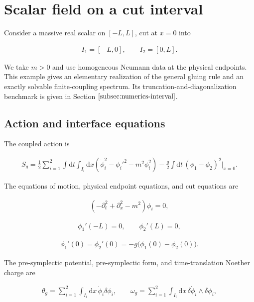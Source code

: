 \section{Scalar field on a cut interval}\label{sec:interval-scalar}

Consider a massive real scalar on $[-L,L]$, cut at $x=0$ into

\begin{align}
I_1=[-L,0],
\qquad
I_2=[0,L].
\end{align}

We take $m>0$ and use homogeneous Neumann data at the physical endpoints. This example gives an elementary realization of the general gluing rule and an exactly solvable finite-coupling spectrum. Its truncation-and-diagonalization benchmark is given in Section $\ref{subsec:numerics-interval}$.

\subsection{Action and interface equations}\label{subsec:interval-action}

The coupled action is

\begin{align}
S_g
=\frac12\sum_{i=1}^2\int\mathrm dt\int_{I_i}\mathrm dx
\left(\dot\phi_i^2-\phi_i'^2-m^2\phi_i^2\right)
-\frac g2\int\mathrm dt\,(\phi_1-\phi_2)^2\big|_{x=0}.
\end{align}

The equations of motion, physical endpoint equations, and cut equations are

\begin{align}
(-\partial_t^2+\partial_x^2-m^2)\phi_i=0,
\end{align}

\begin{align}
\phi_1'(-L)=0,
\qquad
\phi_2'(L)=0,
\end{align}

\begin{align}
\phi_1'(0)=\phi_2'(0)
=-g\bigl(\phi_1(0)-\phi_2(0)\bigr).
\end{align}

The pre-symplectic potential, pre-symplectic form, and time-translation Noether charge are

\begin{align}
\theta_g=\sum_{i=1}^2\int_{I_i}\mathrm dx\,\dot\phi_i\delta\phi_i,
\qquad
\omega_g=\sum_{i=1}^2\int_{I_i}\mathrm dx\,
\delta\dot\phi_i\wedge\delta\phi_i,
\end{align}

